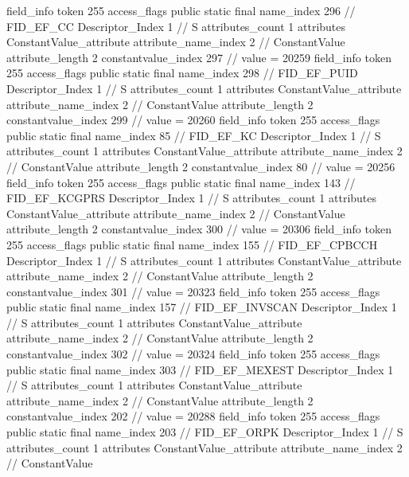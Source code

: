{{{{{{{				}
				}
			}
			field_info {
				token	255
				access_flags	public static final
				name_index	296		// FID_EF_CC
				Descriptor_Index	1		// S
				attributes_count	1
				attributes {
				ConstantValue_attribute {
					attribute_name_index	2		// ConstantValue
					attribute_length	2
					constantvalue_index	297		// value = 20259
				}
				}
			}
			field_info {
				token	255
				access_flags	public static final
				name_index	298		// FID_EF_PUID
				Descriptor_Index	1		// S
				attributes_count	1
				attributes {
				ConstantValue_attribute {
					attribute_name_index	2		// ConstantValue
					attribute_length	2
					constantvalue_index	299		// value = 20260
				}
				}
			}
			field_info {
				token	255
				access_flags	public static final
				name_index	85		// FID_EF_KC
				Descriptor_Index	1		// S
				attributes_count	1
				attributes {
				ConstantValue_attribute {
					attribute_name_index	2		// ConstantValue
					attribute_length	2
					constantvalue_index	80		// value = 20256
				}
				}
			}
			field_info {
				token	255
				access_flags	public static final
				name_index	143		// FID_EF_KCGPRS
				Descriptor_Index	1		// S
				attributes_count	1
				attributes {
				ConstantValue_attribute {
					attribute_name_index	2		// ConstantValue
					attribute_length	2
					constantvalue_index	300		// value = 20306
				}
				}
			}
			field_info {
				token	255
				access_flags	public static final
				name_index	155		// FID_EF_CPBCCH
				Descriptor_Index	1		// S
				attributes_count	1
				attributes {
				ConstantValue_attribute {
					attribute_name_index	2		// ConstantValue
					attribute_length	2
					constantvalue_index	301		// value = 20323
				}
				}
			}
			field_info {
				token	255
				access_flags	public static final
				name_index	157		// FID_EF_INVSCAN
				Descriptor_Index	1		// S
				attributes_count	1
				attributes {
				ConstantValue_attribute {
					attribute_name_index	2		// ConstantValue
					attribute_length	2
					constantvalue_index	302		// value = 20324
				}
				}
			}
			field_info {
				token	255
				access_flags	public static final
				name_index	303		// FID_EF_MEXEST
				Descriptor_Index	1		// S
				attributes_count	1
				attributes {
				ConstantValue_attribute {
					attribute_name_index	2		// ConstantValue
					attribute_length	2
					constantvalue_index	202		// value = 20288
				}
				}
			}
			field_info {
				token	255
				access_flags	public static final
				name_index	203		// FID_EF_ORPK
				Descriptor_Index	1		// S
				attributes_count	1
				attributes {
				ConstantValue_attribute {
					attribute_name_index	2		// ConstantValue
}}}}}}}
